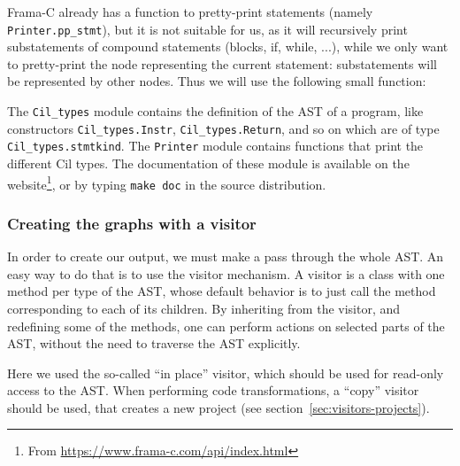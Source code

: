 Frama-C already has a function to pretty-print statements (namely
\texttt{Printer.pp\_stmt}), but it is not
suitable for us, as it will recursively print substatements of compound
statements (blocks, if, while, ...), while we only want to pretty-print
the node representing the current statement: substatements will be represented
by other nodes. Thus we will use the following small function:

The \texttt{Cil\_types} module contains the definition of the AST of a \C
program, like constructors \texttt{Cil\_types.Instr},
\texttt{Cil\_types.Return}, and so on which are of type
\texttt{Cil\_types.stmtkind}. The \texttt{Printer} module contains
functions that print the different Cil types. The documentation of these module
is available on the \framac website\footnote{From
\url{https://www.frama-c.com/api/index.html}}, or by typing
\texttt{make doc} in the \framac source distribution.

\subsubsection*{Creating the graphs with a visitor}

In order to create our output, we must make a pass through the whole
AST. An easy way to do that is to use the \framac visitor mechanism. A
visitor is a class with one method per type of the AST, whose default
behavior is to just call the method corresponding to each of its
children. By inheriting from the visitor, and redefining some of the
methods, one can perform actions on selected parts of the AST, without
the need to traverse the AST explicitly.


Here we used the so-called ``in place'' visitor, which should be used for
read-only access to the AST. When performing code transformations, a
``copy'' visitor should be used, that creates a new project (see
section~\ref{sec:visitors-projects}).

